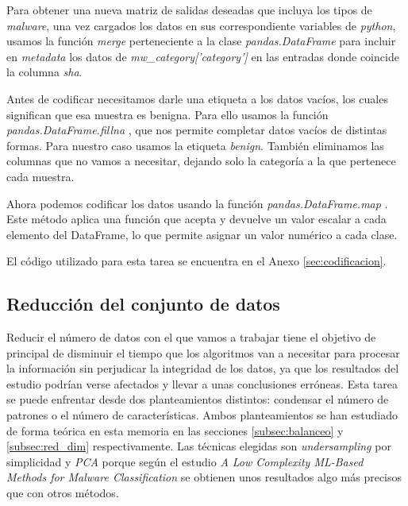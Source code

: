 Para obtener una nueva matriz de salidas deseadas que incluya los tipos de \textit{malware}, una vez cargados los datos en sus correspondiente variables de \textit{python}, usamos la función \textit{merge} \cite{merge} perteneciente a la clase \textit{pandas.DataFrame} para incluir en \textit{metadata} los datos de \textit{mw\_category['category']} en las entradas donde coincide la columna \textit{sha}.

\vspace{1em}

Antes de codificar necesitamos darle una etiqueta a los datos vacíos, los cuales significan que esa muestra es benigna. Para ello usamos la función \textit{pandas.DataFrame.fillna} \cite{fillna}, que nos permite completar datos vacíos de distintas formas. Para nuestro caso usamos la etiqueta \textit{benign}. También eliminamos las columnas que no vamos a necesitar, dejando solo la categoría a la que pertenece cada muestra.

\vspace{1em}

Ahora podemos codificar los datos usando la función \textit{pandas.DataFrame.map} \cite{map}. Este método aplica una función que acepta y devuelve un valor escalar a cada elemento del DataFrame, lo que permite asignar un valor numérico a cada clase.

\vspace{1em}

El código utilizado para esta tarea se encuentra en el Anexo \ref{sec:codificacion}.

\subsection{Reducción del conjunto de datos}
\label{subsec:red_dataset}

Reducir el número de datos con el que vamos a trabajar tiene el objetivo de principal de disminuir el tiempo que los algoritmos van a necesitar para procesar la información sin perjudicar la integridad de los datos, ya que los resultados del estudio podrían verse afectados y llevar a unas conclusiones erróneas. Esta tarea se puede enfrentar desde dos planteamientos distintos: condensar el número de patrones o el número de características. Ambos planteamientos se han estudiado de forma teórica en esta memoria en las secciones \ref{subsec:balanceo} y \ref{subsec:red_dim} respectivamente. Las técnicas elegidas son \textit{undersampling} por simplicidad y \textit{PCA} porque según el estudio \textit{A Low Complexity ML-Based Methods for Malware Classification} \cite{red_dim_pca} se obtienen unos resultados algo más precisos que con otros métodos.

